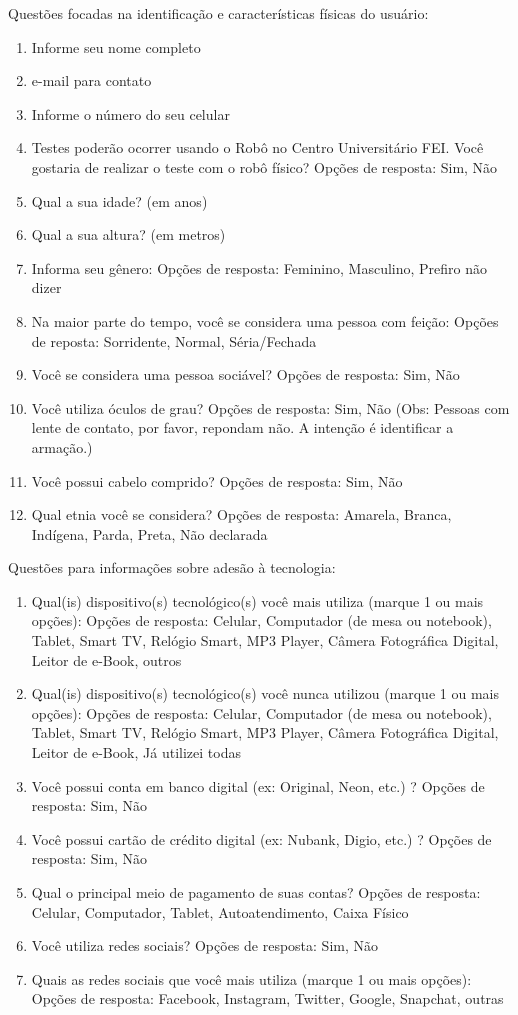 Questões focadas na identificação e características físicas do usuário:

\begin{enumerate}
	\item Informe seu nome completo
	\item e-mail para contato
	\item Informe o número do seu celular
	\item Testes poderão ocorrer usando o Robô no Centro Universitário FEI. Você gostaria de realizar o teste com o robô físico? Opções de resposta: Sim, Não
	\item Qual a sua idade? (em anos)
	\item Qual a sua altura? (em metros)
	\item Informa seu gênero: Opções de resposta: Feminino, Masculino, Prefiro não dizer
	\item Na maior parte do tempo, você se considera uma pessoa com feição: Opções de reposta: Sorridente, Normal, Séria/Fechada
	\item Você se considera uma pessoa sociável? Opções de resposta: Sim, Não
	\item Você utiliza óculos de grau? Opções de resposta: Sim, Não (Obs: Pessoas com lente de contato, por favor, repondam não. A intenção é identificar a armação.)
	\item Você possui cabelo comprido? Opções de resposta: Sim, Não
	\item Qual etnia você se considera? Opções de resposta: Amarela, Branca, Indígena, Parda, Preta, Não declarada
\end{enumerate}

Questões para informações sobre adesão à tecnologia:

\begin{enumerate}
	\item Qual(is) dispositivo(s) tecnológico(s) você mais utiliza (marque 1 ou mais opções): Opções de resposta: Celular, Computador (de mesa ou notebook), Tablet, Smart TV, Relógio Smart, MP3 Player, Câmera Fotográfica Digital, Leitor de e-Book, outros
	\item Qual(is) dispositivo(s) tecnológico(s) você nunca utilizou (marque 1 ou mais opções): Opções de resposta: Celular, Computador (de mesa ou notebook), Tablet, Smart TV, Relógio Smart, MP3 Player, Câmera Fotográfica Digital, Leitor de e-Book, Já utilizei todas
	\item Você possui conta em banco digital (ex: Original, Neon, etc.) ? Opções de resposta: Sim, Não
	\item Você possui cartão de crédito digital (ex: Nubank, Digio, etc.) ? Opções de resposta: Sim, Não
	\item Qual o principal meio de pagamento de suas contas? Opções de resposta: Celular, Computador, Tablet, Autoatendimento, Caixa Físico
	\item Você utiliza redes sociais? Opções de resposta: Sim, Não
	\item Quais as redes sociais que você mais utiliza (marque 1 ou mais opções): Opções de resposta: Facebook, Instagram, Twitter, Google\+, Snapchat, outras
\end{enumerate}

